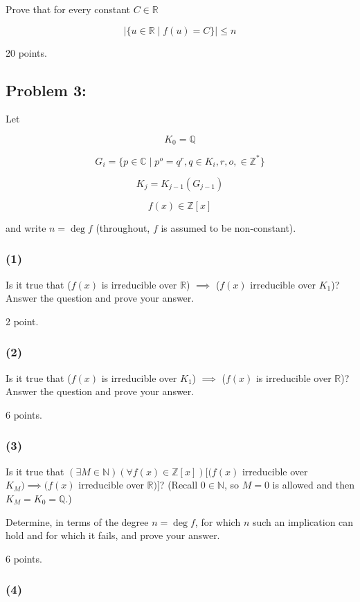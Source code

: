 \documentclass{article}
\begin{document}
Prove that for every constant $C\in \mathbb {R}$

$${\lvert\{u \in \mathbb{R}\mid f(u) = C\}\rvert\leq n}$$

20 points.

\subsection{Problem 3:}

Let

$$K_0=\mathbb{Q}$$

$$G_i=\{p\in \mathbb{C}\mid p^o=q^r,q\in K_i,r,o,\in \mathbb{Z}^*\}$$

$$K_j=K_{j-1}(G_{j-1})$$

$$f(x)\in \mathbb{Z}[x]$$

and write $n=\deg f$ (throughout, $f$ is assumed to be non-constant).

\subsubsection{(1)}

Is it true that ($f(x)$ is irreducible over $\mathbb{R}$) $\implies$ ($f(x)$ irreducible over $K_1$)?Answer the question and prove your answer.

2 point.

\subsubsection{(2)} 

Is it true that ($f(x)$ is irreducible over $K_1$) $\implies$ ($f(x)$ is irreducible over $\mathbb{R}$)?Answer the question and prove your answer.

6 points.

\subsubsection{(3)} 

Is it true that $(\exists M \in \mathbb{N})(\forall f(x) \in \mathbb{Z}[x])[(f(x)$ irreducible over $K_M) \implies (f(x)$ irreducible over $\mathbb{R})]$?
(Recall $0\in\mathbb{N}$, so $M=0$ is allowed and then $K_M=K_0=\mathbb{Q}$.)

Determine, in terms of the degree $n=\deg f$, for which $n$ such an
implication can hold and for which it fails, and prove your answer. 

6 points.

\subsubsection{(4)} 
\end{document}
